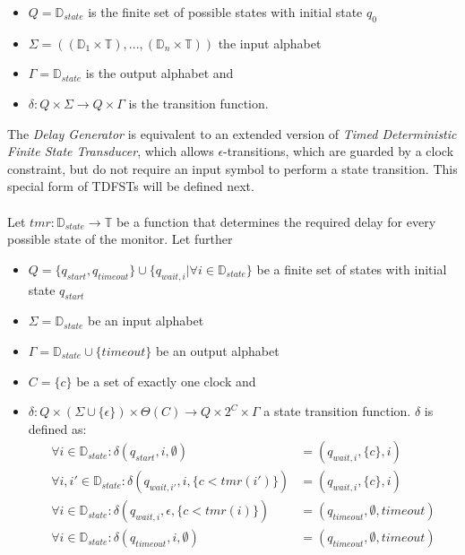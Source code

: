 \begin{itemize}
				\begin{itemize}
					\item
					$Q=\mathbb{D}_{state}$ is the finite set of possible states with initial state $q_0$
					\item
					$\Sigma=((\mathbb{D}_1\times \mathbb{T}),...,(\mathbb{D}_n\times \mathbb{T}))$ the input alphabet
					\item
					$\Gamma = \mathbb D_{state}$ is the output alphabet and
					\item
					$\delta: Q\times \Sigma\rightarrow Q\times\Gamma$ is the transition function.
				\end{itemize}
				The \textit{Delay Generator} is equivalent to an extended version of \textit{Timed Deterministic Finite State Transducer}, which allows $\epsilon$-transitions, which are guarded by a clock constraint, but do not require an input symbol to perform a state transition. This special form of TDFSTs will be defined next.\\ \\
				Let $tmr:\mathbb{D}_{state}\rightarrow\mathbb{T}$ be a function that determines the required delay for every possible state of the monitor. Let further
				\begin{itemize}
					\item
						$Q = \{q_{start}, q_{timeout}\}\cup\{q_{wait,i} | \forall i\in \mathbb{D}_{state}\}$ be a finite set of states with initial state $q_{start}$
					\item
						$\Sigma = \mathbb D_{state}$ be an input alphabet
					\item
						$\Gamma = \mathbb D_{state} \cup \{timeout\}$ be an output alphabet
					\item
						$C=\{c\}$ be a set of exactly one clock and
					\item
						$\delta:Q\times(\Sigma\cup\{\epsilon\})\times\Theta(C)\rightarrow Q\times 2^C\times\Gamma$ a state transition function. $\delta$ is defined as:
						\begin{align}
							\forall i\in \mathbb{D}_{state}:\delta(q_{start}, i, \emptyset) &= (q_{wait,i}, \{c\}, i)\\
							\forall i, i'\in \mathbb{D}_{state}:\delta(q_{wait, i'}, i, \{c < tmr(i')\}) &= (q_{wait,i}, \{c\}, i)\\
							\forall i \in \mathbb{D}_{state}:\delta(q_{wait, i}, \epsilon, \{c < tmr(i)\}) &= (q_{timeout}, \emptyset, timeout)\\
							\forall i \in \mathbb{D}_{state}:\delta(q_{timeout}, i, \emptyset) &= (q_{timeout}, \emptyset, timeout)

\end{align}
\end{itemize}
\end{itemize}
